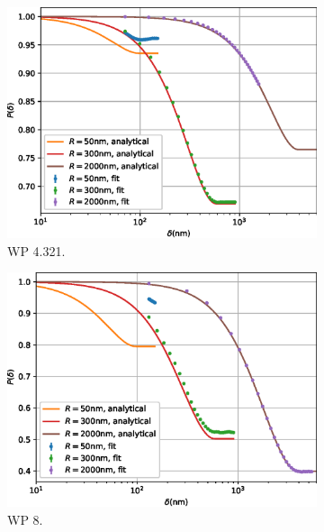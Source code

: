 \begin{figure}[p]
\begin{subfigure}[b]{0.45\textwidth}
		\includegraphics[width=\textwidth]{simulation-plot-rms-WSP-4.321}
		\caption{WP 4.321.}
		\label{fig:simulation-plot-rms-WSP-4.321}
	\end{subfigure}
	\hfill
	\begin{subfigure}[b]{0.45\textwidth}
		\centering
		\includegraphics[width=\textwidth]{simulation-plot-rms-WSP-8}
		\caption{WP 8.}
		\label{fig:simulation-plot-rms-WSP-8}
	\end{subfigure}
	\centering
	\begin{subfigure}[b]{0.45\textwidth}
		\centering

\end{subfigure}
\end{figure}
